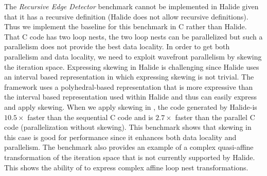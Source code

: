 
The \emph{Recursive Edge Detector} benchmark cannot be implemented in Halide given that it has a recursive definition (Halide does not allow recursive definitions).  Thus we implement the baseline for this benchmark in C rather than Halide.  That C code has two loop nests, the two loop nests can be parallelized but such a parallelism does not provide the best data locality.  In order to get both parallelism and data locality, we need to exploit wavefront parallelism by skewing the iteration space.  Expressing skewing in Halide is challenging since Halide uses an interval based representation in which expressing skewing is not trivial.  The \framework framework uses a polyhedral-based representation that is more expressive than the interval based representation used within Halide and thus \framework can easily express and apply skewing.
When we apply skewing in \framework, the code generated by Halide-\framework is $10.5\times$ faster than the sequential C code and is $2.7\times$ faster than the parallel C code (parallelization without skewing).  This benchmark shows that skewing in this case is good for performance since it enhances both data locality and
parallelism.
The benchmark also provides an example of a complex quasi-affine transformation of the iteration space that is not currently supported by Halide.  This shows the ability of \framework to express complex affine loop nest transformations.



